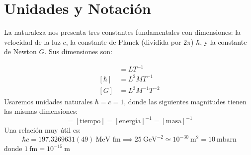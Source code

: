 \documentclass[a4paper,11pt]{book} %
\begin{document}
\section{Unidades y Notación}
\noindent
La naturaleza nos presenta tres constantes fundamentales con dimensiones: la 
velocidad de la luz $c$, la constante de Planck (dividida por $2\pi$) $\hbar$, 
y la constante de Newton $G$. Sus dimensiones son:

\begin{align}
    [c] &= LT^{-1} \\
    [\hbar] &= L^2 M T^{-1} \\
    [G] &= L^3 M^{-1} T^{-2}
\end{align}
Usaremos unidades naturales $\hbar = c = 1$, donde las siguientes magnitudes 
tienen las mismas dimensiones:
\begin{equation}
[\text{longitud}] = [\text{tiempo}] = [\text{energía}]^{-1} = [\text{masa}]^{-1}
\end{equation}
Una relación muy útil es:
\begin{equation}
    \hbar c = 197.3269631(49) \ \text{MeV fm} \implies 
    25 \ \text{GeV}^{-2} \simeq 10^{-30} \ \text{m}^2 = 10 \ \text{mbarn}
\end{equation}
donde $1 \ \text{fm} = 10^{-15} \ \text{m}$ 
\end{document}

